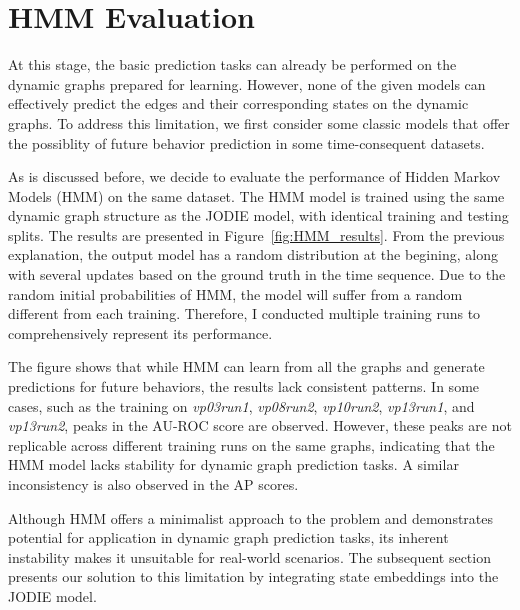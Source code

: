 \clearpage

\section{HMM Evaluation}

At this stage, the basic prediction tasks can already be performed on the dynamic graphs prepared for learning. However, none of the given models can effectively predict the edges and their corresponding states on the dynamic graphs. To address this limitation, we first consider some classic models that offer the possiblity of future behavior prediction in some time-consequent datasets.

As is discussed before, we decide to evaluate the performance of Hidden Markov Models (HMM) on the same dataset. The HMM model is trained using the same dynamic graph structure as the JODIE model, with identical training and testing splits. The results are presented in Figure~\ref{fig:HMM_results}. From the previous explanation, the output model has a random distribution at the begining, along with several updates based on the ground truth in the time sequence. Due to the random initial probabilities of HMM, the model will suffer from a random different from each training. Therefore, I conducted multiple training runs to comprehensively represent its performance.

The figure shows that while HMM can learn from all the graphs and generate predictions for future behaviors, the results lack consistent patterns. In some cases, such as the training on \textit{vp03run1}, \textit{vp08run2}, \textit{vp10run2}, \textit{vp13run1}, and \textit{vp13run2}, peaks in the AU-ROC score are observed. However, these peaks are not replicable across different training runs on the same graphs, indicating that the HMM model lacks stability for dynamic graph prediction tasks. A similar inconsistency is also observed in the AP scores.

Although HMM offers a minimalist approach to the problem and demonstrates potential for application in dynamic graph prediction tasks, its inherent instability makes it unsuitable for real-world scenarios. The subsequent section presents our solution to this limitation by integrating state embeddings into the JODIE model.


